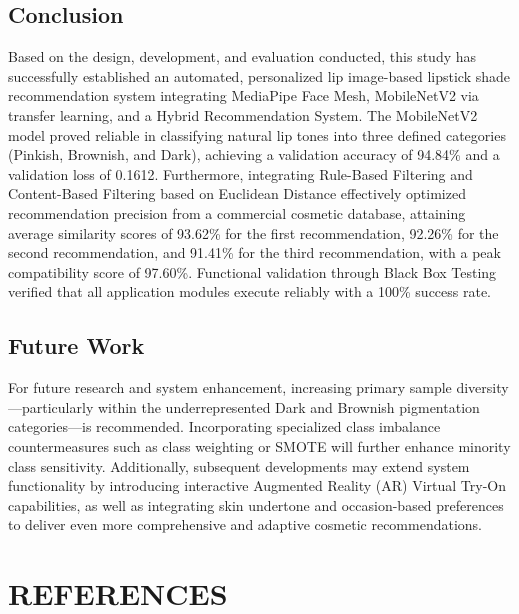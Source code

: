 \documentclass[10pt,a4paper]{article}
\begin{document}
\subsection{Conclusion}
Based on the design, development, and evaluation conducted, this study has successfully established an automated, personalized lip image-based lipstick shade recommendation system integrating MediaPipe Face Mesh, MobileNetV2 via transfer learning, and a Hybrid Recommendation System. The MobileNetV2 model proved reliable in classifying natural lip tones into three defined categories (Pinkish, Brownish, and Dark), achieving a validation accuracy of 94.84\% and a validation loss of 0.1612. Furthermore, integrating Rule-Based Filtering and Content-Based Filtering based on Euclidean Distance effectively optimized recommendation precision from a commercial cosmetic database, attaining average similarity scores of 93.62\% for the first recommendation, 92.26\% for the second recommendation, and 91.41\% for the third recommendation, with a peak compatibility score of 97.60\%. Functional validation through Black Box Testing verified that all application modules execute reliably with a 100\% success rate.

\subsection{Future Work}
For future research and system enhancement, increasing primary sample diversity—particularly within the underrepresented Dark and Brownish pigmentation categories—is recommended. Incorporating specialized class imbalance countermeasures such as class weighting or SMOTE will further enhance minority class sensitivity. Additionally, subsequent developments may extend system functionality by introducing interactive Augmented Reality (AR) Virtual Try-On capabilities, as well as integrating skin undertone and occasion-based preferences to deliver even more comprehensive and adaptive cosmetic recommendations.

\section*{REFERENCES}
\end{document}

